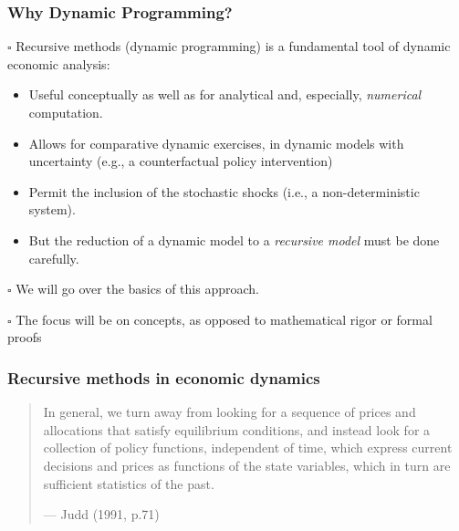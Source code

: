 \documentclass[10pt, handout]{beamer}
\begin{document}
\begin{frame}

\frametitle{Why Dynamic Programming?} \vskip 0.1in

$\square$ Recursive methods (dynamic programming) is a fundamental tool of dynamic economic analysis:
\begin{itemize}
\item Useful conceptually as well as for analytical and, especially, \textit{numerical} computation.

\item Allows for comparative dynamic exercises, in dynamic models with uncertainty (e.g., a counterfactual policy intervention)

\item Permit the inclusion of the stochastic shocks (i.e., a non-deterministic system).

\item But the reduction of a dynamic model to a \textit{recursive model} must be done carefully. 

\end{itemize}

$\square$ We will go over the basics of this approach.

$\square$ The focus will be on concepts, as opposed to mathematical rigor or formal proofs


\end{frame}




\begin{frame}

\frametitle{Recursive methods in economic dynamics} %

\begin{quote}
In general, we turn away from looking for a sequence of prices and allocations that satisfy equilibrium conditions, and instead look for a collection of policy functions, independent of time, which express current decisions and prices as functions of the state variables, which in turn are sufficient statistics of the past. 
\begin{flushright}
--- Judd (1991, p.71)
\end{flushright} 
\end{quote} \vskip 0.2in

\end{frame}
\end{document}
